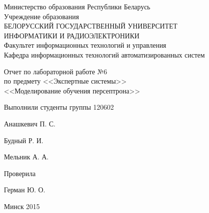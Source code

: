 \thispagestyle{empty}
\setlength{\parindent}{0ex} %

\begin{center}
  Министерство образования Республики Беларусь \\
  \smallskip
  Учреждение образования \\
  БЕЛОРУССКИЙ ГОСУДАРСТВЕННЫЙ УНИВЕРСИТЕТ \\
  ИНФОРМАТИКИ И РАДИОЭЛЕКТРОНИКИ \\
  \smallskip
  Факультет информационных технологий и управления \\
  \smallskip
  Кафедра информационных технологий автоматизированных систем
\end{center}

\vspace{40mm}

\begin{center}
  Отчет по лабораторной работе №6 \\
  по предмету <<Экспертные системы>> \\
  <<Моделирование обучения персептрона>> 
\end{center}

\vspace{45mm}

\begin{minipage}{.55\linewidth}
    Выполнили студенты группы 120602
    \vspace{12mm}
\end{minipage}
\hfill
\begin{minipage}{.4\linewidth}
  \begin{flushright}
    Анашкевич П. С.

    Будный Р. И.

    Мельник А. А.
  \end{flushright}
\end{minipage}

\vspace{10mm}

\begin{minipage}{.55\linewidth}
    Проверила
\end{minipage}
\hfill
\begin{minipage}{.4\linewidth}
  \begin{flushright}
    Герман Ю. О.

  \end{flushright}
\end{minipage}

\vspace{40mm}
\begin{center}
  Минск 2015
\end{center}

\setlength{\parindent}{5ex} %

